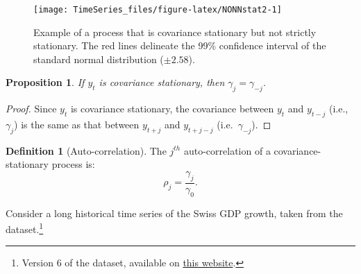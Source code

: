 \documentclass[
  12pt,
]{book}
\newtheorem{proposition}{Proposition}[chapter]
\theoremstyle{definition}
\newtheorem{definition}{Definition}[chapter]
\theoremstyle{definition}
\theoremstyle{definition}
\theoremstyle{definition}
\theoremstyle{remark}
\begin{document}
\begin{figure}
\texttt{[image: TimeSeries\_files/figure-latex/NONNstat2-1]} \caption{Example of a process that is covariance stationary but not strictly stationary. The red lines delineate the 99\% confidence interval of the standard normal distribution ($\pm 2.58$).}\label{fig:NONNstat2}
\end{figure}

\begin{proposition}
\protect\hypertarget{prp:gammaMinus}{}\label{prp:gammaMinus}If \(y_t\) is covariance stationary, then \(\gamma_j = \gamma_{-j}\).
\end{proposition}

\begin{proof}
Since \(y_t\) is covariance stationary, the covariance between \(y_t\) and \(y_{t-j}\) (i.e., \(\gamma_j\)) is the same as that between \(y_{t+j}\) and \(y_{t+j-j}\) (i.e.~\(\gamma_{-j}\)).
\end{proof}

\begin{definition}[Auto-correlation]
\protect\hypertarget{def:autocor}{}\label{def:autocor}The \(j^{th}\) auto-correlation of a covariance-stationary process is:
\[
\rho_j = \frac{\gamma_j}{\gamma_0}.
\]
\end{definition}

Consider a long historical time series of the Swiss GDP growth, taken from the \citet{JST_2017} dataset.\footnote{Version 6 of the dataset, available on \href{https://www.macrohistory.net}{this website}.}
\end{document}
